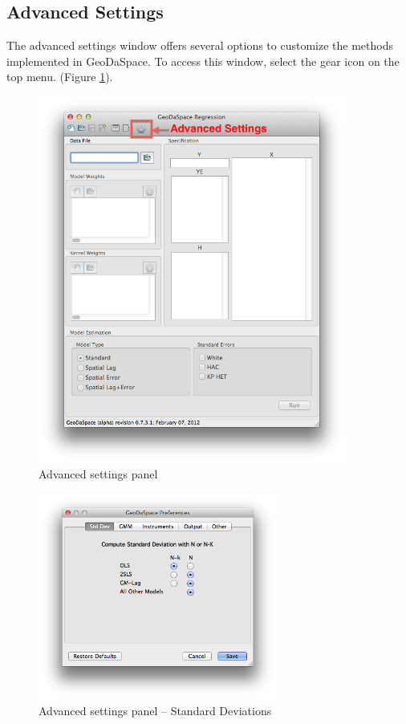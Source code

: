 \documentclass{article}
\begin{document}
\subsection{Advanced Settings}
\label{s:adv}


The advanced settings window offers several options to customize the methods implemented in GeoDaSpace. To access this window, select the gear icon on the top menu. (Figure \ref{f:gui_adv}).
 
\begin{figure}[htb]
\centering
\includegraphics[width=0.9\textwidth]{GUI_adv.png}
\caption{Advanced settings panel}
\label{f:gui_adv}
\end{figure}
\FloatBarrier

\begin{figure}[htb]
\centering
\includegraphics[width=0.7\textwidth]{adv_std.png}
\caption{Advanced settings panel -- Standard Deviations}
\label{f:adv_std}
\end{figure}
\end{document}
